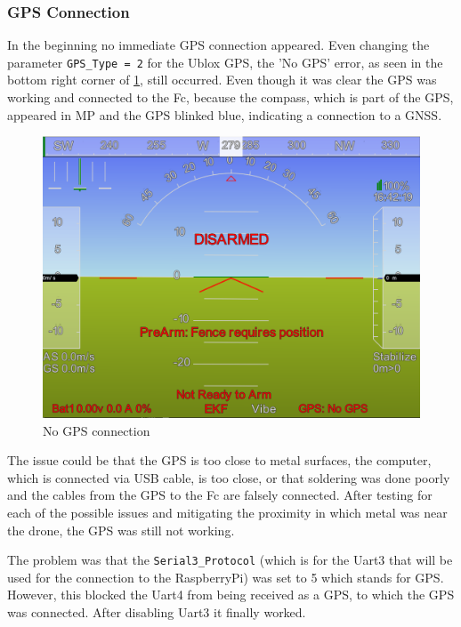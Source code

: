 \documentclass[svgnames]{article}
\begin{document}
	\subsubsection{GPS Connection}
	In the beginning no immediate \gls{GPS} connection appeared. Even changing the parameter \lstinline|GPS_Type = 2| for the Ublox \gls{GPS}, the 'No \gls{GPS}' error, as seen in the bottom right corner of \cref{fig:nogps}, still occurred. Even though it was clear the \gls{GPS} was working and connected to the \gls{Fc}, because the compass, which is part of the \gls{GPS}, appeared in \gls{MP} and the \gls{GPS} blinked blue, indicating a connection to a \gls{GNSS}.
\begin{figure}[ht]
	\centering
	\includegraphics[scale=0.2]{pictures/No_GPS}
	\caption{No \gls{GPS} connection}
	\label{fig:nogps}
\end{figure}

	The issue could be that the \gls{GPS} is too close to metal surfaces, the computer, which is connected via USB cable, is too close, or that soldering was done poorly and the cables from the \gls{GPS} to the \gls{Fc} are falsely connected. After testing for each of the possible issues and mitigating the proximity in which metal was near the drone, the \gls{GPS} was still not working.

	The problem was that the \lstinline|Serial3_Protocol| (which is for the Uart3 that will be used for the connection to the RaspberryPi) was set to 5 which stands for \gls{GPS}. However, this blocked the Uart4 from being received as a \gls{GPS}, to which the \gls{GPS} was connected. After disabling Uart3 it finally worked.
\end{document}
